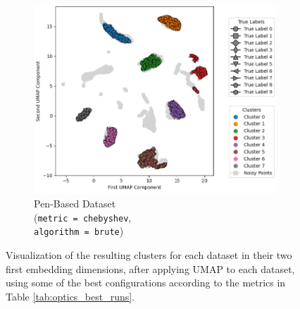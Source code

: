 \begin{figure}[H]
\begin{subfigure}{0.32\textwidth}
	\end{subfigure}
	\hfill
	\begin{subfigure}{0.32\textwidth}
		\centering
		\includegraphics[width=\linewidth]{figures/Optics/pen-based/best_run_CHS_umap.png}
		\caption{Pen-Based Dataset \\ (\texttt{metric = chebyshev}, \\ \texttt{algorithm = brute})}
	\end{subfigure}
	\caption{Visualization of the resulting clusters for each dataset in their two first embedding dimensions, after applying UMAP to each dataset, using some of the best configurations according to the metrics in Table \ref{tab:optics_best_runs}.}
	\label{fig:optics-clusters-br-umap}
\end{figure}